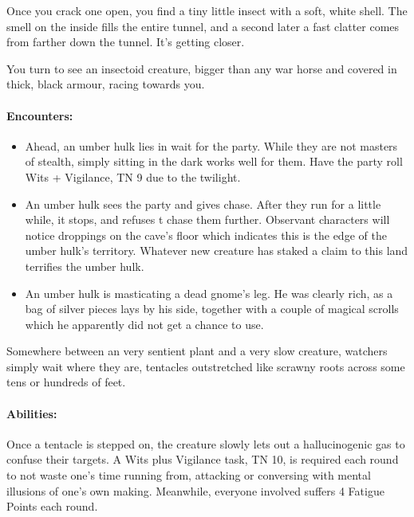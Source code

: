 \begin{multicols}{2}
\begin{boxtext}

	Once you crack one open, you find a tiny little insect with a soft, white shell.
	The smell on the inside fills the entire tunnel, and a second later a fast clatter comes from farther down the tunnel.
	It's getting closer.

	You turn to see an insectoid creature, bigger than any war horse and covered in thick, black armour, racing towards you.

\end{boxtext}

\paragraph{Encounters:}

\begin{itemize}

	\item
	Ahead, an umber hulk lies in wait for the party.
	While they are not masters of stealth, simply sitting in the dark works well for them.
	Have the party roll Wits + Vigilance, TN 9 due to the twilight.
	\item
	An umber hulk sees the party and gives chase.
	After they run for a little while, it stops, and refuses t chase them further.
	Observant characters will notice droppings on the cave's floor which indicates this is the edge of the umber hulk's territory.
	Whatever new creature has staked a claim to this land terrifies the umber hulk.
	\item
	An umber hulk is masticating a dead gnome's leg.
	He was clearly rich, as a bag of silver pieces lays by his side, together with a couple of magical scrolls which he apparently did not get a chance to use.

\end{itemize}

\umberhulk

\label{watcher}

Somewhere between an very sentient plant and a very slow creature, watchers simply wait where they are, tentacles outstretched like scrawny roots across some tens or hundreds of feet.
\paragraph{Abilities:} Once a tentacle is stepped on, the creature slowly lets out a hallucinogenic gas to confuse their targets.
A Wits plus Vigilance task, TN 10, is required each round to not waste one's time running from, attacking or conversing with mental illusions of one's own making.
Meanwhile, everyone involved suffers 4 Fatigue Points each round.


\end{multicols}
